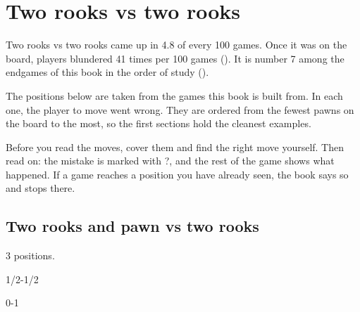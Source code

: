 \chapter{Two rooks vs two rooks}\label{ch:two-rooks-vs-two-rooks}
Two rooks vs two rooks came up in 4.8 of every 100 games. Once it was on the board, players blundered 41 times per 100 games (). It is number 7 among the endgames of this book in the order of study ().

The positions below are taken from the games this book is built from. In each one, the player to move went wrong. They are ordered from the fewest pawns on the board to the most, so the first sections hold the cleanest examples.

Before you read the moves, cover them and find the right move yourself. Then read on: the mistake is marked with ?, and the rest of the game shows what happened. If a game reaches a position you have already seen, the book says so and stops there.


\section{Two rooks and pawn vs two rooks}
3 positions.


1/2-1/2\par
{}

0-1\par
{}


